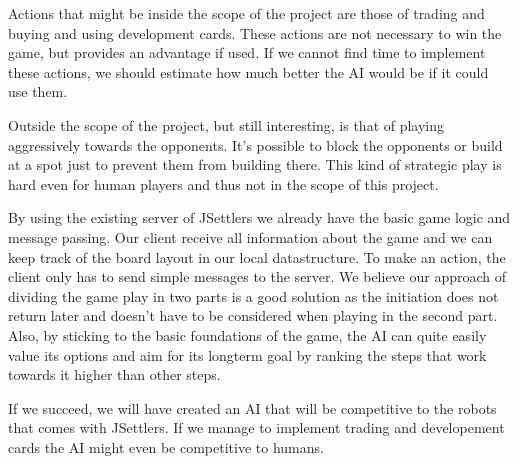 \documentclass[]{article}
\begin{document}
Actions that might be inside the scope of the project are those of trading and buying and using development cards. These actions are not necessary to win the game, but provides an advantage if used. If we cannot find time to implement these actions, we should estimate how much better the AI would be if it could use them.

Outside the scope of the project, but still interesting, is that of playing aggressively towards the opponents. It's possible to block the opponents or build at a spot just to prevent them from building there. This kind of strategic play is hard even for human players and thus not in the scope of this project.

By using the existing server of JSettlers we already have the basic game logic and message passing. Our client receive all information about the game and we can keep track of the board layout in our local datastructure. To make an action, the client only has to send simple messages to the server. We believe our approach of dividing the game play in two parts is a good solution as the initiation does not return later and doesn't have to be considered when playing in the second part. Also, by sticking to the basic foundations of the game, the AI can quite easily value its options and aim for its longterm goal by ranking the steps that work towards it higher than other steps.

If we succeed, we will have created an AI that will be competitive to the robots that comes with JSettlers. If we manage to implement trading and developement cards the AI might even be competitive to humans.
\end{document}

